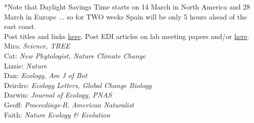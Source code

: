 \documentclass[11pt]{article}
\begin{document}
*Note that Daylight Savings Time starts on 14 March in North America and 28 March in Europe ... so for TWO weeks Spain will be only 5 hours ahead of the east coast.\\
\vspace{7pt}
 Post titles and links \href{https://docs.google.com/document/d/1j0WdDbjdp8ERLSO7whvtnP-tOblYMlX33TSCXy_uRKo/edit?usp=sharing}{\underline{here}}. Post EDI articles on lab meeting papers and/or  \href{https://docs.google.com/document/d/18VbP-03oD0BsArxYm60g1ZvvFL7IoA3-6rpdHb1eLPw/edit#heading=h.gsqcglkhxkzg}{here}.\\
Mira: \emph{Science, TREE} \\
Cat: \emph{New Phytologist, Nature Climate Change}\\
Lizzie: \emph{Nature}\\
Dan: \emph{Ecology, Am J of Bot }\\
Deirdre: \emph{Ecology Letters, Global Change Biology}\\
Darwin: \emph{Journal of Ecology, PNAS}\\
Geoff: \emph{Proceedings-B, American Naturalist} \\
Faith: \emph{Nature Ecology \& Evolution}\\
\end{document}
